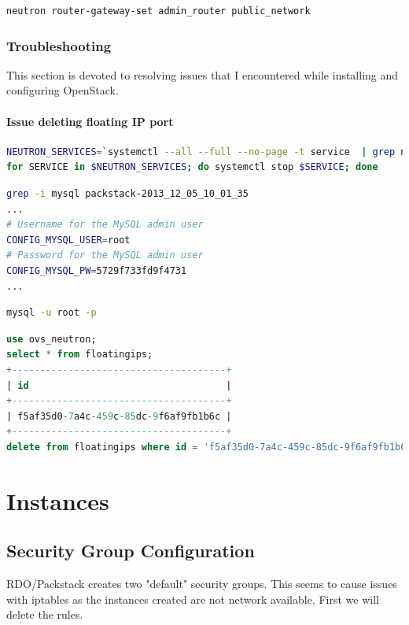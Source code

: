 \documentclass[11pt,letterpaper,oneside]{book}
\begin{document}
\begin{lstlisting}[caption={Set the router gateway},language=bash]
neutron router-gateway-set admin_router public_network
\end{lstlisting}
\subsection{Troubleshooting}
This section is devoted to resolving issues that I encountered while installing and configuring OpenStack.
\subsubsection{Issue deleting floating IP port}
\begin{lstlisting}[caption={Stop Neutron Services},language=bash]
NEUTRON_SERVICES=`systemctl --all --full --no-page -t service  | grep neutron | awk '{print $1}'`
for SERVICE in $NEUTRON_SERVICES; do systemctl stop $SERVICE; done
\end{lstlisting}

\begin{lstlisting}[caption={Find the MariaDB root password},language=bash]
grep -i mysql packstack-2013_12_05_10_01_35 
...
# Username for the MySQL admin user
CONFIG_MYSQL_USER=root
# Password for the MySQL admin user
CONFIG_MYSQL_PW=5729f733fd9f4731
...
\end{lstlisting}
\begin{lstlisting}[caption={Login to MariaDB},language=bash]
mysql -u root -p
\end{lstlisting}
\begin{lstlisting}[caption={Get the ID for the floating IP and delete},language=sql]
use ovs_neutron;
select * from floatingips;
+--------------------------------------+
| id                                   |
+--------------------------------------+
| f5af35d0-7a4c-459c-85dc-9f6af9fb1b6c |
+--------------------------------------+
delete from floatingips where id = 'f5af35d0-7a4c-459c-85dc-9f6af9fb1b6c'
\end{lstlisting}

\chapter{Instances}
\section{Security Group Configuration}
RDO/Packstack creates two "default" security groups.  This seems to cause issues with iptables as the instances created are not network available.  First we will delete the rules.
\end{document}
